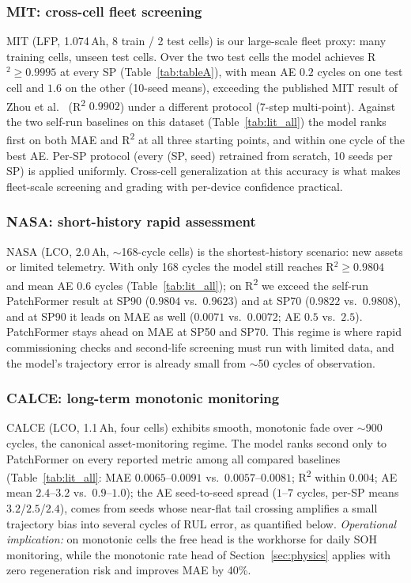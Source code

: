 \subsubsection{MIT: cross-cell fleet screening}
MIT (LFP, 1.074\,Ah, 8 train / 2 test cells) is our large-scale
fleet proxy: many training cells, unseen test cells. Over the two
test cells the model achieves R$^2 \ge 0.9995$ at every SP
(Table~\ref{tab:tableA}), with mean AE $0.2$ cycles on one test cell
and $1.6$ on the other (10-seed means), exceeding the published MIT
result of Zhou et al.\ \cite{ref_zhou2025}
(R\textsuperscript{2} $0.9902$) under a different protocol (7-step multi-point).
Against the two self-run baselines on this dataset
(Table~\ref{tab:lit_all}) the model ranks first on both
MAE and R\textsuperscript{2} at all three starting points, and within one
cycle of the best AE. Per-SP protocol (every (SP, seed) retrained from scratch, 10 seeds
per SP) is applied uniformly. Cross-cell generalization at this
accuracy is what makes fleet-scale screening and grading with
per-device confidence practical.


\subsubsection{NASA: short-history rapid assessment}
NASA (LCO, 2.0\,Ah, $\sim$168-cycle cells) is the shortest-history
scenario: new assets or limited telemetry. With only 168 cycles the
model still reaches R$^2 \ge 0.9804$ and mean AE $0.6$ cycles
(Table~\ref{tab:lit_all}); on R\textsuperscript{2} we exceed the self-run
PatchFormer result at SP90
($0.9804$ vs.\ $0.9623$) and at SP70 ($0.9822$ vs.\ $0.9808$), and at
SP90 it leads on MAE as well ($0.0071$ vs.\ $0.0072$; AE $0.5$ vs.\
$2.5$). PatchFormer stays ahead on MAE at SP50 and SP70. This regime is where
rapid commissioning checks and second-life screening must run with
limited data, and the model's trajectory error is already small from
$\sim$50 cycles of observation.



\subsubsection{CALCE: long-term monotonic monitoring}
CALCE (LCO, 1.1\,Ah, four cells) exhibits smooth, monotonic fade over
$\sim$900 cycles, the canonical asset-monitoring regime. The model
ranks second only to PatchFormer on every reported metric among all
compared baselines (Table~\ref{tab:lit_all}: MAE
$0.0065$--$0.0091$ vs.\ $0.0057$--$0.0081$; R\textsuperscript{2} within $0.004$; AE
mean $2.4$--$3.2$ vs.\ $0.9$--$1.0$); the AE seed-to-seed spread
($1$--$7$ cycles, per-SP means $3.2$/$2.5$/$2.4$), comes from seeds
whose near-flat tail crossing
amplifies a small trajectory bias into several cycles of RUL error,
as quantified below. \emph{Operational
implication:} on
monotonic cells the free head is the workhorse for daily SOH
monitoring, while the monotonic rate head of Section~\ref{sec:physics}
applies with zero regeneration risk and improves MAE by 40\%.


